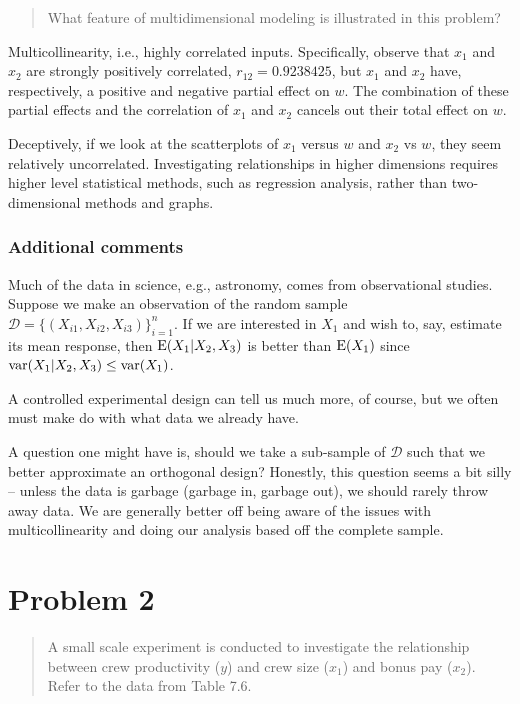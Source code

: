 \documentclass[
]{article}
\begin{document}
\begin{quote}
What feature of multidimensional modeling is illustrated in this
problem?
\end{quote}

Multicollinearity, i.e., highly correlated inputs. Specifically, observe
that \(x_1\) and \(x_2\) are strongly positively correlated,
\(r_{1 2} = 0.9238425\), but \(x_1\) and \(x_2\) have, respectively, a
positive and negative partial effect on \(w\). The combination of these
partial effects and the correlation of \(x_1\) and \(x_2\) cancels out
their total effect on \(w\).

Deceptively, if we look at the scatterplots of \(x_1\) versus \(w\) and
\(x_2\) vs \(w\), they seem relatively uncorrelated. Investigating
relationships in higher dimensions requires higher level statistical
methods, such as regression analysis, rather than two-dimensional
methods and graphs.

\hypertarget{additional-comments}{%
\subsubsection{Additional comments}\label{additional-comments}}

Much of the data in science, e.g., astronomy, comes from observational
studies. Suppose we make an observation of the random sample
\(\mathcal{D} = \{(X_{i 1},X_{i 2},X_{i 3})\}_{i=1}^{n}\). If we are
interested in \(X_1\) and wish to, say, estimate its mean response, then
\(\operatorname{E}(X_1|X_2,X_3)\) is better than \(\operatorname{E}(X_1)\) since
\(\operatorname{var}(X_1|X_2,X_3) \leq \operatorname{var}(X_1)\).

A controlled experimental design can tell us much more, of course, but
we often must make do with what data we already have.

A question one might have is, should we take a sub-sample of
\(\mathcal{D}\) such that we better approximate an orthogonal design?
Honestly, this question seems a bit silly -- unless the data is garbage
(garbage in, garbage out), we should rarely throw away data. We are
generally better off being aware of the issues with multicollinearity
and doing our analysis based off the complete sample.

\hypertarget{problem-2}{%
\section{Problem 2}\label{problem-2}}

\begin{quote}
A small scale experiment is conducted to investigate the relationship
between crew productivity (\(y\)) and crew size (\(x_1\)) and bonus pay
(\(x_2\)). Refer to the data from Table 7.6.
\end{quote}
\end{document}
